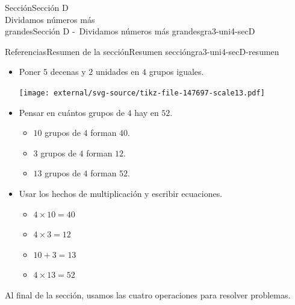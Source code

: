 \begin{sectionptx}{Sección}{{\Large Sección D\\}Dividamos números más\\grandes}{}{Sección D -~Dividamos números más grandes}{}{}{gra3-uni4-secD}
\begin{references-subsection}{Referencias}{Resumen de la sección}{}{Resumen sección}{}{}{gra3-uni4-secD-resumen}
\begin{itemize}[label=\textbullet]
\item{}Poner \(5\) decenas y \(2\) unidades en \(4\) grupos iguales.%
\begin{image}{0}{1}{0}{}%
\texttt{[image: external/svg-source/tikz-file-147697-scale13.pdf]}
\end{image}%
\item{}Pensar en cuántos grupos de \(4\) hay en \(52\).%
%
\begin{itemize}[label=$\circ$]
\item{}\(10\) grupos de \(4\) forman \(40\).%
\item{}\(3\) grupos de \(4\) forman \(12\).%
\item{}\(13\) grupos de \(4\) forman \(52\).%
\end{itemize}
\item{}Usar los hechos de multiplicación y escribir ecuaciones.%
%
\begin{itemize}[label=$\circ$]
\item{}\(\displaystyle 4 \times 10 = 40\)%
\item{}\(\displaystyle 4 \times 3 = 12\)%
\item{}\(\displaystyle 10 + 3 = 13\)%
\item{}\(\displaystyle 4 \times 13 = 52\)%
\end{itemize}
\end{itemize}
Al final de la sección, usamos las cuatro operaciones para resolver problemas.%
\end{references-subsection}
\end{sectionptx}
%
%
\typeout{************************************************}
\typeout{************************************************}
%
%
%
\typeout{************************************************}
\typeout{************************************************}
%
\clearpage
